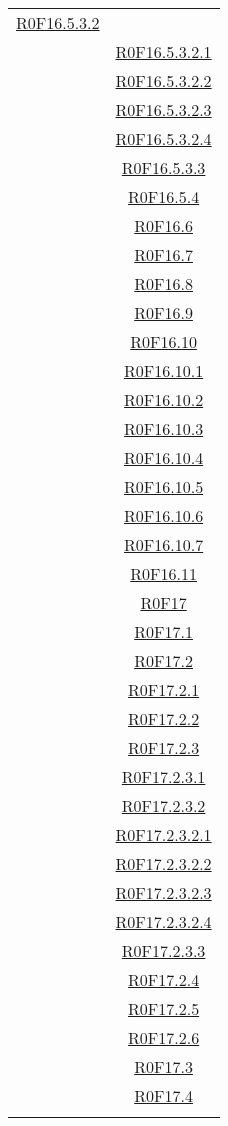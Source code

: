 \documentclass[../AnalisiDeiRequisiti.tex]{subfiles}
\begin{document}
\begin{longtable}{|c|c|}
\hyperlink{R0F16.5.3.2}{R0F16.5.3.2}\\& \hyperlink{R0F16.5.3.2.1}{R0F16.5.3.2.1}\\& \hyperlink{R0F16.5.3.2.2}{R0F16.5.3.2.2}\\& \hyperlink{R0F16.5.3.2.3}{R0F16.5.3.2.3}\\& \hyperlink{R0F16.5.3.2.4}{R0F16.5.3.2.4}\\& \hyperlink{R0F16.5.3.3}{R0F16.5.3.3}\\& \hyperlink{R0F16.5.4}{R0F16.5.4}\\& \hyperlink{R0F16.6}{R0F16.6}\\& \hyperlink{R0F16.7}{R0F16.7}\\& \hyperlink{R0F16.8}{R0F16.8}\\& \hyperlink{R0F16.9}{R0F16.9}\\& \hyperlink{R0F16.10}{R0F16.10}\\& \hyperlink{R0F16.10.1}{R0F16.10.1}\\& \hyperlink{R0F16.10.2}{R0F16.10.2}\\& \hyperlink{R0F16.10.3}{R0F16.10.3}\\& \hyperlink{R0F16.10.4}{R0F16.10.4}\\& \hyperlink{R0F16.10.5}{R0F16.10.5}\\& \hyperlink{R0F16.10.6}{R0F16.10.6}\\& \hyperlink{R0F16.10.7}{R0F16.10.7}\\& \hyperlink{R0F16.11}{R0F16.11}\\& \hyperlink{R0F17}{R0F17}\\& \hyperlink{R0F17.1}{R0F17.1}\\& \hyperlink{R0F17.2}{R0F17.2}\\& \hyperlink{R0F17.2.1}{R0F17.2.1}\\& \hyperlink{R0F17.2.2}{R0F17.2.2}\\& \hyperlink{R0F17.2.3}{R0F17.2.3}\\& \hyperlink{R0F17.2.3.1}{R0F17.2.3.1}\\& \hyperlink{R0F17.2.3.2}{R0F17.2.3.2}\\& \hyperlink{R0F17.2.3.2.1}{R0F17.2.3.2.1}\\& \hyperlink{R0F17.2.3.2.2}{R0F17.2.3.2.2}\\& \hyperlink{R0F17.2.3.2.3}{R0F17.2.3.2.3}\\& \hyperlink{R0F17.2.3.2.4}{R0F17.2.3.2.4}\\& \hyperlink{R0F17.2.3.3}{R0F17.2.3.3}\\& \hyperlink{R0F17.2.4}{R0F17.2.4}\\& \hyperlink{R0F17.2.5}{R0F17.2.5}\\& \hyperlink{R0F17.2.6}{R0F17.2.6}\\& \hyperlink{R0F17.3}{R0F17.3}\\& \hyperlink{R0F17.4}{R0F17.4}\\& 
\end{longtable}
\end{document}
